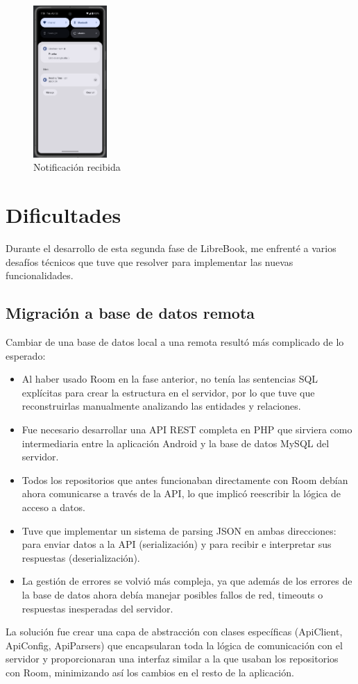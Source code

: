 \documentclass[a4paper,11pt]{report}
\begin{document}
      \begin{figure}[H]
        \centering
        \includegraphics[width=0.25\textwidth]{.img/mensaje_notificacion.png}
        \caption{Notificación recibida}
        \label{fig:mensaje-notificacion}
      \end{figure}
  \chapter{Dificultades}
    Durante el desarrollo de esta segunda fase de LibreBook, me enfrenté a varios desafíos técnicos que tuve que resolver para implementar las nuevas funcionalidades.
    \section{Migración a base de datos remota}
      Cambiar de una base de datos local a una remota resultó más complicado de lo esperado:
      \begin{itemize}
        \item Al haber usado Room en la fase anterior, no tenía las sentencias SQL explícitas para crear la estructura en el servidor, por lo que tuve que reconstruirlas manualmente analizando las entidades y relaciones.
        \item Fue necesario desarrollar una API REST completa en PHP que sirviera como intermediaria entre la aplicación Android y la base de datos MySQL del servidor.
        \item Todos los repositorios que antes funcionaban directamente con Room debían ahora comunicarse a través de la API, lo que implicó reescribir la lógica de acceso a datos.
        \item Tuve que implementar un sistema de parsing JSON en ambas direcciones: para enviar datos a la API (serialización) y para recibir e interpretar sus respuestas (deserialización).
        \item La gestión de errores se volvió más compleja, ya que además de los errores de la base de datos ahora debía manejar posibles fallos de red, timeouts o respuestas inesperadas del servidor.
      \end{itemize}
      La solución fue crear una capa de abstracción con clases específicas (ApiClient, ApiConfig, ApiParsers) que encapsularan toda la lógica de comunicación con el servidor y proporcionaran una interfaz similar a la que usaban los repositorios con Room, minimizando así los cambios en el resto de la aplicación.
\end{document}
